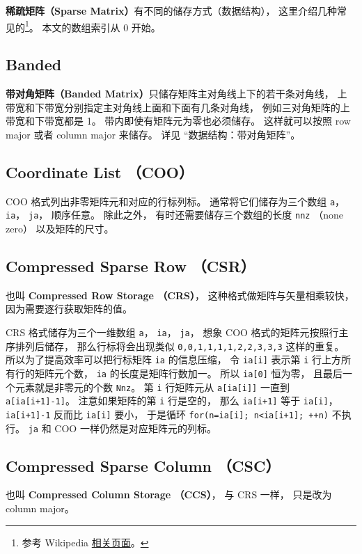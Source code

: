 
\textbf{稀疏矩阵（Sparse Matrix）}有不同的储存方式（数据结构）， 这里介绍几种常见的\footnote{参考 Wikipedia \href{https://en.wikipedia.org/wiki/Sparse_matrix}{相关页面}。}。 本文的数组索引从 0 开始。

\subsection{Banded}
\textbf{带对角矩阵（Banded Matrix）}只储存矩阵主对角线上下的若干条对角线， 上带宽和下带宽分别指定主对角线上面和下面有几条对角线， 例如三对角矩阵的上带宽和下带宽都是 1。 带内即使有矩阵元为零也必须储存。 这样就可以按照 row major 或者 column major 来储存。 详见 “数据结构：带对角矩阵”。

\subsection{Coordinate List （COO）}
COO 格式列出非零矩阵元和对应的行标列标。 通常将它们储存为三个数组 \verb|a|， \verb|ia|， \verb|ja|， 顺序任意。 除此之外， 有时还需要储存三个数组的长度 \verb|nnz| （none zero） 以及矩阵的尺寸。

\subsection{Compressed Sparse Row （CSR）}\label{}
也叫 \textbf{Compressed Row Storage （CRS）}， 这种格式做矩阵与矢量相乘较快，因为需要逐行获取矩阵的值。

CRS 格式储存为三个一维数组 \verb|a|， \verb|ia|， \verb|ja|， 想象 COO 格式的矩阵元按照行主序排列后储存， 那么行标将会出现类似 \verb|0,0,1,1,1,1,2,2,3,3,3| 这样的重复。 所以为了提高效率可以把行标矩阵 \verb|ia| 的信息压缩， 令 \verb|ia[i]| 表示第 \verb|i| 行上方所有行的矩阵元个数， \verb|ia| 的长度是矩阵行数加一。 所以 \verb|ia[0]| 恒为零， 且最后一个元素就是非零元的个数 \verb|Nnz|。 第 \verb|i| 行矩阵元从 \verb|a[ia[i]]| 一直到 \verb|a[ia[i+1]-1]|。 注意如果矩阵的第 \verb|i| 行是空的， 那么 \verb|ia[i+1]| 等于 \verb|ia[i]|， \verb|ia[i+1]-1| 反而比 \verb|ia[i]| 要小， 于是循环 \verb|for(n=ia[i]; n<ia[i+1]; ++n)| 不执行。 \verb|ja| 和 COO 一样仍然是对应矩阵元的列标。

\subsection{Compressed Sparse Column （CSC）}
也叫 \textbf{Compressed Column Storage （CCS）}， 与 CRS 一样， 只是改为 column major。
